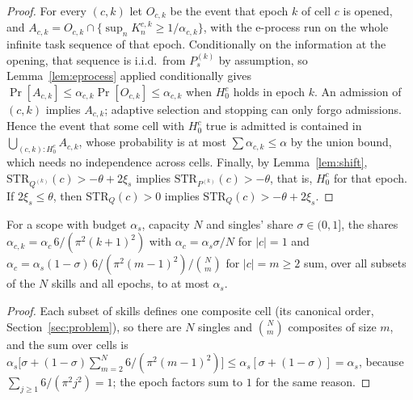 \begin{proof}
For every $(c,k)$ let $O_{c,k}$ be the event that epoch $k$ of cell $c$ is opened, and
$A_{c,k}=O_{c,k}\cap\{\sup_n K^{c,k}_n\ge1/\alpha_{c,k}\}$, with the e-process run on the whole infinite task sequence of that epoch.
Conditionally on the information at the opening, that sequence is i.i.d.\ from $P^{(k)}_s$ by assumption, so Lemma~\ref{lem:eprocess}
applied conditionally gives $\Pr[A_{c,k}]\le\alpha_{c,k}\Pr[O_{c,k}]\le\alpha_{c,k}$ when $H_0^c$ holds in epoch $k$.  An admission of $(c,k)$
implies $A_{c,k}$; adaptive selection and stopping can only forgo admissions.  Hence the
event that some cell with $H_0^c$ true is admitted is contained in $\bigcup_{(c,k):H_0^c}A_{c,k}$, whose probability is at
most $\sum\alpha_{c,k}\le\alpha$ by the union bound, which needs no independence across cells.
Finally, by Lemma~\ref{lem:shift}, $\mathrm{STR}_{Q^{(k)}}(c)>-\theta+2\xi_s$ implies $\mathrm{STR}_{P^{(k)}}(c)>-\theta$,
that is, $H_0^{c}$ for that epoch.  If $2\xi_s\le\theta$, then $\mathrm{STR}_{Q}(c)>0$ implies
$\mathrm{STR}_{Q}(c)>-\theta+2\xi_s$.
\end{proof}

\begin{lemma}\label{lem:ledger}
For a scope with budget $\alpha_s$, capacity $N$ and singles' share $\sigma\in(0,1]$, the shares
$\alpha_{c,k}=\alpha_c\,6/(\pi^2(k+1)^2)$ with $\alpha_c=\alpha_s\sigma/N$ for $|c|=1$ and
$\alpha_c=\alpha_s(1-\sigma)\,6/(\pi^2(m-1)^2)/\binom{N}{m}$ for $|c|=m\ge2$ sum, over all subsets of the $N$ skills and all epochs, to at
most $\alpha_s$.
\end{lemma}

\begin{proof}
Each subset of skills defines one composite cell (its canonical order, Section~\ref{sec:problem}), so there are $N$ singles and
$\binom{N}{m}$ composites of size $m$, and the sum over cells is
$\alpha_s\bigl[\sigma+(1-\sigma)\sum_{m=2}^{N}6/(\pi^2(m-1)^2)\bigr]\le\alpha_s[\sigma+(1-\sigma)]=\alpha_s$, because
$\sum_{j\ge1}6/(\pi^2j^2)=1$; the epoch factors sum to $1$ for the same reason.
\end{proof}

